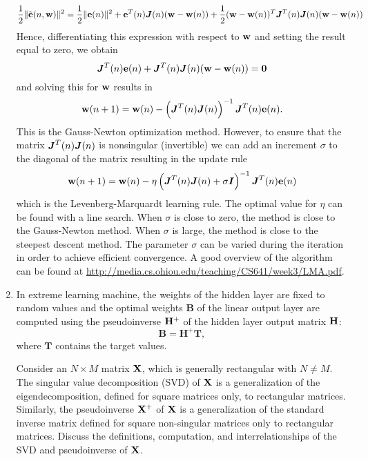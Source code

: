 \begin{enumerate}
\begin{solution}
    \[
    \frac{1}{2} \| \tilde{{\bf{e}}}(n,{\bf{w}}) \|^2 = \frac{1}{2}
    \|{\bf{e}}(n)\|^2 + {\bf{e}}^T(n)\boldsymbol{J}(n)({\bf{w}}-{\bf{w}}(n))
    +
    \frac{1}{2}({\bf{w}}-{\bf{w}}(n))^T\boldsymbol{J}^T(n)\boldsymbol{J}(n)({\bf{w}}-{\bf{w}}(n))
    \]
    Hence, differentiating this expression with respect to ${\bf{w}}$
    and setting the result equal to zero, we obtain
    \[
    \boldsymbol{J}^T(n){\bf{e}}(n) +
    \boldsymbol{J}^T(n)\boldsymbol{J}(n)({\bf{w}}-{\bf{w}}(n))={\bf{0}}
    \]
    and solving this for ${\bf{w}}$ results in
    \[
    {\bf{w}}(n+1) = {\bf{w}}(n) -
    \left(\boldsymbol{J}^T(n)\boldsymbol{J}(n)\right)^{-1}\boldsymbol{J}^T(n){\bf{e}}(n).
    \]
    This is the Gauss-Newton optimization method.  However, to ensure
    that the matrix $\boldsymbol{J}^T(n)\boldsymbol{J}(n)$ is nonsingular
    (invertible) we can add an increment $\sigma$ to the diagonal of
    the matrix resulting in the update rule
    \[
    {\bf{w}}(n+1) = {\bf{w}}(n) - \eta\left(\boldsymbol{J}^T(n)\boldsymbol{J}(n) + \sigma
      \boldsymbol{I} \right)^{-1}\boldsymbol{J}^T(n){\bf{e}}(n)
    \]
    which is the Levenberg-Marquardt learning rule.  The optimal value for
    $\eta$ can be found with a line search.  When $\sigma$ is close to zero, the
    method is close to the Gauss-Newton method.  When $\sigma$ is large, the
    method is close to the steepest descent method.  The parameter $\sigma$ can
    be varied during the iteration in order to achieve efficient convergence. A
    good overview of the algorithm can be found at
    \url{http://media.cs.ohiou.edu/teaching/CS641/week3/LMA.pdf}.
  \end{solution}


\item In extreme learning machine, the weights of the hidden layer are
  fixed to random values and the optimal weights $\mathbf{B}$ of the
  linear output layer are computed using the pseudoinverse ${\bf H}^+$
  of the hidden layer output matrix ${\bf H}$:
  \begin{equation*}
    \mathbf{B} = \mathbf{H}^+ \mathbf{T},
  \end{equation*}
  where $\mathbf{T}$ contains the target values.

  Consider an $N \times M$ matrix ${\bf X}$, which is generally
  rectangular with $N \neq M$.  The singular value decomposition (SVD)
  of ${\bf X}$ is a generalization of the eigendecomposition, defined
  for square matrices only, to rectangular matrices.  Similarly, the
  pseudoinverse ${\bf X}^+$ of ${\bf X}$ is a generalization of the
  standard inverse matrix defined for square non-singular matrices
  only to rectangular matrices. Discuss the definitions, computation,
  and interrelationships of the SVD and pseudoinverse of ${\bf X}$.


\end{enumerate}
